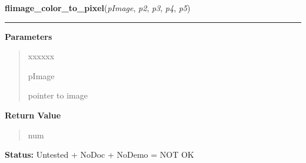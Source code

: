 \hspace{.8\funcindent}\begin{boxedminipage}{\funcwidth}

    \raggedright \textbf{flimage\_color\_to\_pixel}(\textit{pImage}, \textit{p2}, \textit{p3}, \textit{p4}, \textit{p5})

    \vspace{-1.5ex}

    \rule{\textwidth}{0.5\fboxrule}
\setlength{\parskip}{2ex}
\setlength{\parskip}{1ex}
      \textbf{Parameters}
      \vspace{-1ex}

      \begin{quote}
        \begin{Ventry}{xxxxxx}

          \item[pImage]

          pointer to image

        \end{Ventry}

      \end{quote}

      \textbf{Return Value}
    \vspace{-1ex}

      \begin{quote}
      num

      \end{quote}

\textbf{Status:} Untested + NoDoc + NoDemo = NOT OK



    \end{boxedminipage}

    \label{xformslib:library:flimage_combine}

    \vspace{0.5ex}

